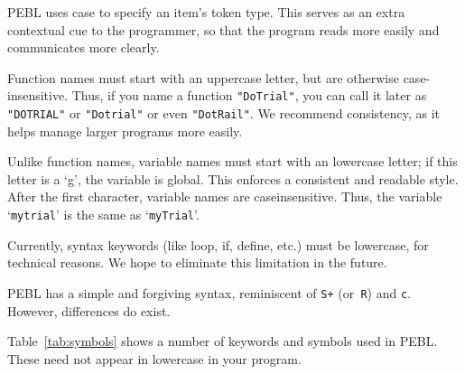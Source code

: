 PEBL uses case to specify an item's token type. This serves as an extra contextual cue to the programmer, so that the program reads more easily and communicates more clearly.

Function names must start with an uppercase letter, but are otherwise
case-insensitive.  Thus, if you name a function \texttt{"DoTrial"}, you can
call it later as \texttt{"DOTRIAL"} or \texttt{"Dotrial"} or even \texttt{"DotRail"}.  We recommend consistency, as it helps manage larger programs more easily.

Unlike function names, variable names must start with an lowercase letter; if this letter is a `g', the variable is global. This enforces a consistent and readable style. After the first character, variable names are caseinsensitive. Thus, the variable `\texttt{mytrial}' is the same as `\texttt{myTrial}'.

Currently, syntax keywords (like loop, if, define, etc.) must be
lowercase, for technical reasons. We hope to eliminate this limitation in the future.


\vfill
{}

PEBL has a simple and forgiving syntax, reminiscent of \texttt{S+} (or\texttt{ R})
and \texttt{c}. However, differences do exist.

Table~\ref{tab:symbols} shows a number of keywords and symbols used in PEBL. These need not appear in lowercase in your program.


